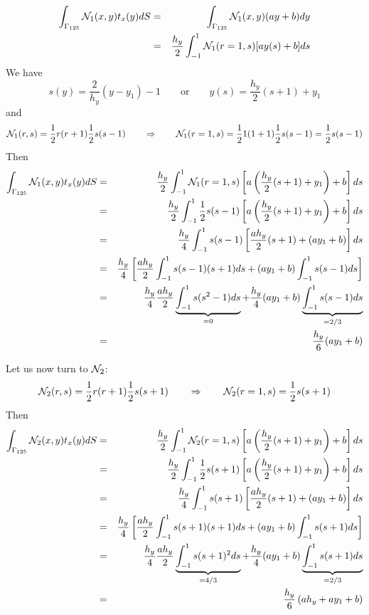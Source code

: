 \begin{eqnarray}
\int_{\Gamma_{125}} {\mathcal{N}}_1(x,y) t_x(y) dS 
&=&\int_{\Gamma_{125}} {\mathcal{N}}_1(x,y) (ay+b) dy \nonumber\\
&=&\frac{h_y}{2} \int_{-1}^1 {\mathcal{N}}_1(r=1,s) [ay(s)+b] ds \nonumber
\end{eqnarray}
We have 
\[
s(y)=\frac{2}{h_y}(y-y_1)-1 
\qquad
\text{or}
\qquad
y(s)= \frac{h_y}{2}(s+1) +y_1
\]
and
\[
{\mathcal{N}}_1(r,s) 
= \frac{1}{2}r(r+1)\frac{1}{2}s(s-1)
\qquad
\Rightarrow
\qquad
{\mathcal{N}}_1(r=1,s) 
= \frac{1}{2}1(1+1)\frac{1}{2}s(s-1) 
= \frac{1}{2}s(s-1) 
\]
Then
\begin{eqnarray}
\int_{\Gamma_{125}} {\mathcal{N}}_1(x,y) t_x(y) dS 
&=&\frac{h_y}{2} \int_{-1}^1 {\mathcal{N}}_1(r=1,s) \left[ a \left(\frac{h_y}{2}(s+1) +y_1\right) +b \right] ds \nonumber\\
&=&\frac{h_y}{2} \int_{-1}^1 \frac12 s(s-1) \left[ a \left(\frac{h_y}{2}(s+1) +y_1\right) +b \right] ds \nonumber\\
&=&\frac{h_y}{4} \int_{-1}^1 s(s-1) \left[ \frac{a h_y}{2}(s+1) + (ay_1+b) \right] ds \nonumber\\
&=& \frac{h_y}{4} \left[
\frac{a h_y}{2} \int_{-1}^1 s(s-1) (s+1)  ds 
+(ay_1+b) \int_{-1}^1 s(s-1)   ds 
\right] \nonumber\\
&=& \frac{h_y}{4} 
\frac{a h_y}{2} \underbrace{\int_{-1}^1 s(s^2-1)  ds}_{=0} 
+\frac{h_y}{4} (ay_1+b) \underbrace{\int_{-1}^1 s(s-1)   ds}_{=2/3} \nonumber\\
&=& \frac{h_y}{6} (ay_1+b)
\end{eqnarray}

Let us now turn to ${\mathcal{N}}_2$:
\[
{\mathcal{N}}_2(r,s) = \frac12 r(r+1) \frac12 s(s+1)
\qquad
\Rightarrow
\qquad
{\mathcal{N}}_2(r=1,s) = \frac12 s(s+1)
\]
Then
\begin{eqnarray}
\int_{\Gamma_{125}} {\mathcal{N}}_2(x,y) t_x(y) dS 
&=&\frac{h_y}{2} \int_{-1}^1 {\mathcal{N}}_2(r=1,s) \left[ a \left(\frac{h_y}{2}(s+1) +y_1\right) +b \right] ds \nonumber\\
&=&\frac{h_y}{2} \int_{-1}^1 \frac12 s(s+1) \left[ a \left(\frac{h_y}{2}(s+1) +y_1\right) +b \right] ds \nonumber\\
&=&\frac{h_y}{4} \int_{-1}^1 s(s+1) \left[ \frac{a h_y}{2}(s+1) + (ay_1+b) \right] ds \nonumber\\
&=& \frac{h_y}{4} \left[
\frac{a h_y}{2} \int_{-1}^1 s(s+1) (s+1)  ds 
+(ay_1+b) \int_{-1}^1 s(s+1)   ds 
\right] \nonumber\\
&=& \frac{h_y}{4} 
\frac{a h_y}{2} \underbrace{\int_{-1}^1 s(s+1)^2  ds}_{=4/3} 
+\frac{h_y}{4} (ay_1+b) \underbrace{\int_{-1}^1 s(s+1)  ds}_{=2/3} \nonumber \\
&=& \frac{h_y}{6} \left( a h_y + ay_1+b   \right)
\end{eqnarray}



